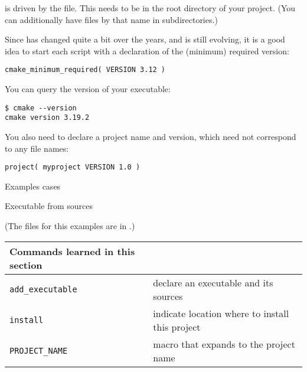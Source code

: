  is driven by the  file.
This needs to be in the root directory of your project.
(You can additionally have files by that name in subdirectories.)

Since  has changed quite a bit over the years,
and is still evolving,
it is a good idea to start each script with a declaration
of the (minimum) required version:
\begin{lstlisting}
cmake_minimum_required( VERSION 3.12 )
\end{lstlisting}
You can query the version of your  executable:
\begin{verbatim}
$ cmake --version
cmake version 3.19.2
\end{verbatim}

You also need to declare a project name and version,
which need not correspond to any file names:
\begin{lstlisting}
project( myproject VERSION 1.0 )
\end{lstlisting}

\newpage
{} {Examples cases}

 {Executable from sources}

(The files for this examples are in .)

\begin{tabular}{lp{3in}}
  \toprule
  Commands learned in this section\\
  \midrule
  \lstinline+add_executable+&declare an executable and its sources\\
  \lstinline+install+&indicate location where to install this project\\
  \lstinline+PROJECT_NAME+&macro that expands to the project name \\
  \bottomrule
\end{tabular}

